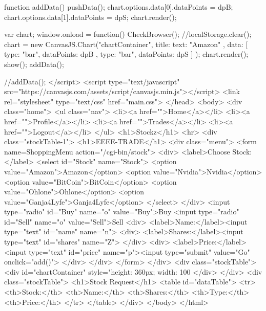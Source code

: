 \begin{DoxyVerbInclude}
function addData() {
  pushData();
  chart.options.data[0].dataPoints = dpB;
  chart.options.data[1].dataPoints = dpS;
  chart.render();
}

var chart;
window.onload = function(){
  CheckBrowser();
  //localStorage.clear();
  chart = new CanvasJS.Chart("chartContainer",
    {
      title:{
      text: "Amazon"  
      },
      data: [
      {        
        type: "bar",
        dataPoints: dpB
      },
      {        
        type: "bar",
        dataPoints: dpS
      }]
    });
    chart.render();
  show();
  addData();
}

//addData();
  </script>
  <script type="text/javascript" src="https://canvasjs.com/assets/script/canvasjs.min.js"></script>
  <link rel="stylesheet" type="text/css" href="main.css">
</head>
<body>
<div class="home">
  <ul class="nav">
    <li><a href="">Home</a></li>
    <li><a href="">Profile</a></li>
    <li><a href="">Trades</a></li>
    <li><a href="">Logout</a></li>
  </ul>
  <h1>Stockz</h1>
  <hr>
  <div class="stockTable-1">
    <h1>EEEE-TRADE</h1>
    <div class="menu">
      <form name=ShoppingMenu action="/cgi-bin/stock">
        <div>
          <label>Choose Stock:</label>
          <select id="Stock" name="Stock">
            <option value="Amazon">Amazon</option>
            <option value="Nvidia">Nvidia</option>
            <option value="BitCoin">BitCoin</option>
            <option value="Ohlone">Ohlone</option>
            <option value="Ganja4Lyfe">Ganja4Lyfe</option>
          </select>
          </div>
        <input type="radio" id="Buy" name="o" value="Buy">Buy
        <input type="radio" id="Sell" name="o" value="Sell">Sell
        <div>
        <label>Name:</label><input type="text" id="name" name="n">
          <div>
            <label>Shares:</label><input type="text" id="shares" name="Z">
          </div>
          <div>
            <label>Price:</label><input type="text" id="price" name="p"><input type="submit" value="Go" onclick="add()">
          </div>
        </div>
      </form>
    </div>
    <div class="stockTable">
      <div id="chartContainer" style="height: 360px; width: 100%
    </div>
  </div>
<div class="stockTable">
  <h1>Stock Request</h1>
  <table id="dataTable">
  <tr>
    <th>Stock:</th>
    <th>Name:</th>
    <th>Shares:</th>
    <th>Type:</th>
    <th>Price:</th>
  </tr>
  </table>
</div>
</body>
</html>
\end{DoxyVerbInclude}
 